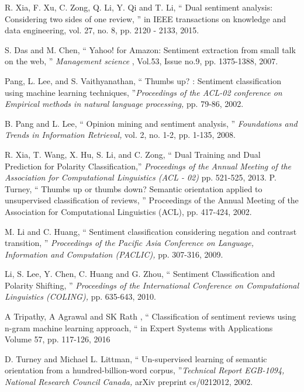 \documentclass[oneside,a4paper,12pt]{pictreport}
\begin{document}
\begin{thebibliography}{20}



R. Xia, F. Xu, C. Zong, Q. Li, Y. Qi and T. Li, `` Dual sentiment analysis: Considering  two  sides  of  one 
review, '' in IEEE transactions on knowledge and data engineering, vol. 27, no. 8, pp. 2120
-
2133, 2015.

  S. Das and M. Chen, `` Yahoo! for Amazon: Sentiment extraction from small talk on the web, '' {\em Management science} , Vol.53, Issue no.9, pp. 1375-1388, 2007.

  
  
  Pang, L. Lee, and S. Vaithyanathan, `` Thumbs up? : Sentiment classification using machine
  learning techniques, ''{\em Proceedings of the ACL-02 conference on Empirical methods in natural language processing,}
  pp. 79-86, 2002.
  
  B. Pang and L. Lee, `` Opinion mining and sentiment analysis, '' {\em Foundations
  and Trends in Information Retrieval,} vol. 2, no. 1-2, pp. 1-135, 2008.
  
  R. Xia, T. Wang, X. Hu, S. Li, and C. Zong, `` Dual Training and Dual
Prediction for Polarity Classification,'' {\em Proceedings of the Annual 
Meeting of the Association for Computational Linguistics (ACL - 02)} pp. 521-525,
2013.
  P. Turney, `` Thumbs up or thumbs down? Semantic orientation applied to 
  unsupervised classification of reviews, '' Proceedings of the Annual Meeting of 
  the Association for Computational Linguistics (ACL), pp. 417-424, 2002.

  
  M. Li and C. Huang, `` Sentiment classification considering negation
and contrast transition, '' {\em Proceedings of the Pacific Asia Conference on
Language, Information and Computation (PACLIC),}  pp. 307-316, 2009.


  Li, S. Lee, Y. Chen, C. Huang and G. Zhou, `` Sentiment 
  Classification and Polarity Shifting, '' {\em Proceedings of the International Conference on
  Computational Linguistics (COLING),} pp. 635-643, 2010.
  
  A Tripathy, A Agrawal and SK Rath , `` Classification of sentiment reviews using 
n-gram machine learning approach, `` in Expert Systems with Applications
Volume 57, pp. 117-126, 2016
  
  D. Turney and Michael L. Littman, `` Un-supervised learning of semantic orientation from
a hundred-billion-word corpus, ''{\em Technical Report
EGB-1094, National Research Council Canada,} arXiv preprint cs/0212012, 2002.


\end{thebibliography}
\end{document}
